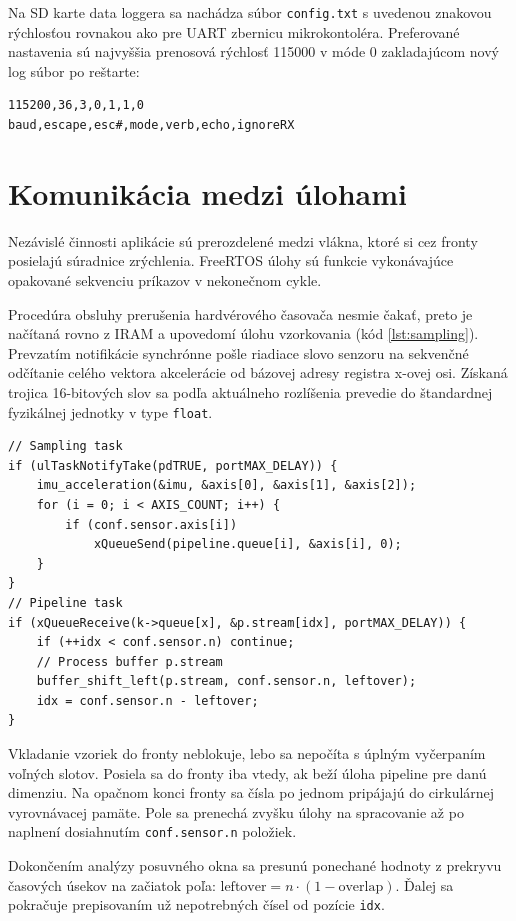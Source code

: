 Na SD karte data loggera sa nachádza súbor \verb|config.txt| s uvedenou znakovou rýchlosťou
rovnakou ako pre UART zbernicu mikrokontoléra. Preferované nastavenia sú najvyššia prenosová rýchlosť 115000
v móde 0 zakladajúcom nový log súbor po reštarte:
\begin{lstlisting}[style=implementation]
115200,36,3,0,1,1,0
baud,escape,esc#,mode,verb,echo,ignoreRX
\end{lstlisting}

\section{Komunikácia medzi úlohami}
Nezávislé činnosti aplikácie sú prerozdelené medzi vlákna, ktoré si cez fronty posielajú súradnice zrýchlenia.
FreeRTOS úlohy sú funkcie vykonávajúce opakované sekvenciu príkazov v nekonečnom cykle.

Procedúra obsluhy prerušenia hardvérového časovača nesmie čakať, preto je načítaná rovno z IRAM a upovedomí úlohu vzorkovania
(kód \ref{lst:sampling}). Prevzatím notifikácie synchrónne pošle riadiace slovo senzoru na sekvenčné odčítanie celého vektora
akcelerácie od bázovej adresy registra x-ovej osi. Získaná trojica 16-bitových slov sa podľa aktuálneho rozlíšenia prevedie
do štandardnej fyzikálnej jednotky v type \verb|float|.

\begin{lstlisting}[style=cstyle,caption=Posielanie vzoriek medzi úlohami cez fronty,label={lst:sampling},
 morekeywords={ulTaskNotifyTake,xQueueSend,xQueueReceive,buffer_shift_left,p.stream}]
// Sampling task
if (ulTaskNotifyTake(pdTRUE, portMAX_DELAY)) {
	imu_acceleration(&imu, &axis[0], &axis[1], &axis[2]);
	for (i = 0; i < AXIS_COUNT; i++) {
    	if (conf.sensor.axis[i])
        	xQueueSend(pipeline.queue[i], &axis[i], 0);
    }
}
// Pipeline task
if (xQueueReceive(k->queue[x], &p.stream[idx], portMAX_DELAY)) {
	if (++idx < conf.sensor.n) continue;
    // Process buffer p.stream
    buffer_shift_left(p.stream, conf.sensor.n, leftover);
    idx = conf.sensor.n - leftover;
}
\end{lstlisting}
Vkladanie vzoriek do fronty neblokuje, lebo sa nepočíta s úplným vyčerpaním voľných slotov. Posiela sa do fronty
iba vtedy, ak beží úloha pipeline pre danú dimenziu. Na opačnom konci fronty sa čísla po jednom pripájajú do
cirkulárnej vyrovnávacej pamäte. Pole sa prenechá zvyšku úlohy na spracovanie až po naplnení
dosiahnutím \verb|conf.sensor.n| položiek.

Dokončením analýzy posuvného okna sa presunú ponechané hodnoty z prekryvu časových úsekov na začiatok
poľa: $\mathrm{leftover} = n \cdot (1 - \mathrm{overlap})$. Ďalej sa pokračuje prepisovaním už nepotrebných čísel od pozície \verb|idx|.

